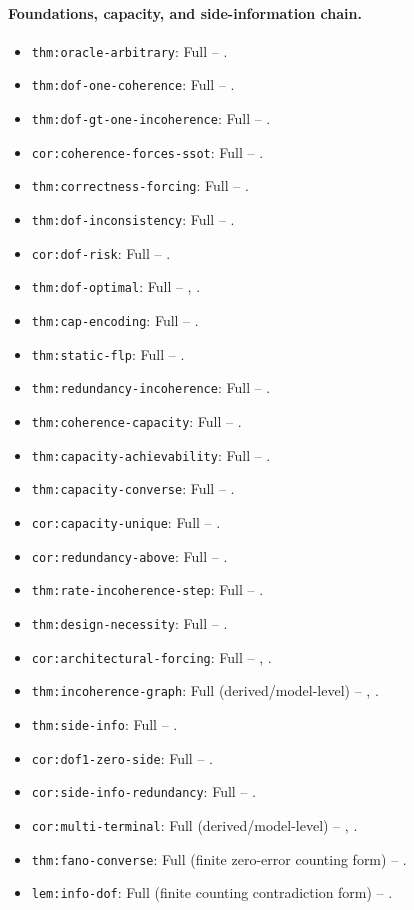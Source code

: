 \begingroup
\scriptsize
\paragraph{Foundations, capacity, and side-information chain.}
\begin{itemize}
\item \nolinkurl{thm:oracle-arbitrary}: Full -- .
\item \nolinkurl{thm:dof-one-coherence}: Full -- .
\item \nolinkurl{thm:dof-gt-one-incoherence}: Full -- .
\item \nolinkurl{cor:coherence-forces-ssot}: Full -- .
\item \nolinkurl{thm:correctness-forcing}: Full -- .
\item \nolinkurl{thm:dof-inconsistency}: Full -- .
\item \nolinkurl{cor:dof-risk}: Full -- .
\item \nolinkurl{thm:dof-optimal}: Full -- , .
\item \nolinkurl{thm:cap-encoding}: Full -- .
\item \nolinkurl{thm:static-flp}: Full -- .
\item \nolinkurl{thm:redundancy-incoherence}: Full -- .
\item \nolinkurl{thm:coherence-capacity}: Full -- .
\item \nolinkurl{thm:capacity-achievability}: Full -- .
\item \nolinkurl{thm:capacity-converse}: Full -- .
\item \nolinkurl{cor:capacity-unique}: Full -- .
\item \nolinkurl{cor:redundancy-above}: Full -- .
\item \nolinkurl{thm:rate-incoherence-step}: Full -- .
\item \nolinkurl{thm:design-necessity}: Full -- .
\item \nolinkurl{cor:architectural-forcing}: Full -- , .
\item \nolinkurl{thm:incoherence-graph}: Full (derived/model-level) -- , .
\item \nolinkurl{thm:side-info}: Full -- .
\item \nolinkurl{cor:dof1-zero-side}: Full -- .
\item \nolinkurl{cor:side-info-redundancy}: Full -- .
\item \nolinkurl{cor:multi-terminal}: Full (derived/model-level) -- , .
\item \nolinkurl{thm:fano-converse}: Full (finite zero-error counting form) -- .
\item \nolinkurl{lem:info-dof}: Full (finite counting contradiction form) -- .
\end{itemize}

